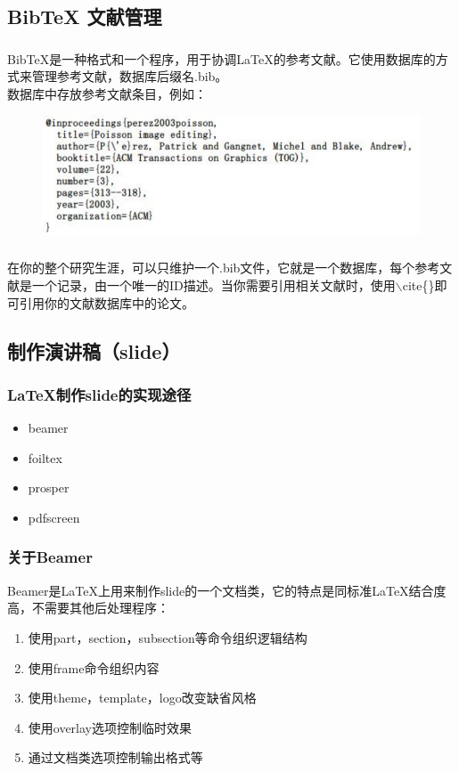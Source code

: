 \documentclass{beamer}
\begin{document}
  \subsection{BibTeX 文献管理}
  \frame
  {
    \frametitle{\subsecname}
    BibTeX是一种格式和一个程序，用于协调\LaTeX 的参考文献。它使用数据库的方式来管理参考文献，数据库后缀名.bib。\\
    数据库中存放参考文献条目，例如：

    \begin{figure}
    \includegraphics[scale=0.6]{bibtex_example.pdf}
    \end{figure}
  }

  \frame
  {
    \frametitle{\subsecname}
    在你的整个研究生涯，可以只维护一个.bib文件，它就是一个数据库，每个参考文献是一个记录，由一个唯一的ID描述。当你需要引用相关文献时，使用$\backslash$cite\{\}即可引用你的文献数据库中的论文。
  }

  \subsection{制作演讲稿（slide）}

  \frame
  {
    \frametitle{\LaTeX 制作slide的实现途径}
    \begin{itemize}
    \item beamer
    \item foiltex
    \item prosper
    \item pdfscreen
    \end{itemize}
  }

  \frame
  {
    \frametitle{关于Beamer}
    Beamer是\LaTeX 上用来制作slide的一个文档类，它的特点是同标准\LaTeX 结合度高，不需要其他后处理程序：
    \begin{enumerate}
    \item 使用part，section，subsection等命令组织逻辑结构
    \item 使用frame命令组织内容
    \item 使用theme，template，logo改变缺省风格
    \item 使用overlay选项控制临时效果
    \item 通过文档类选项控制输出格式等
    \end{enumerate}
  }
\end{document}
